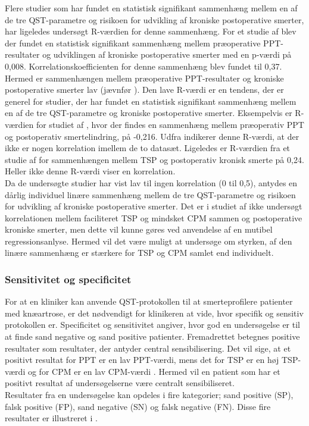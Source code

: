 Flere studier som har fundet en statistisk signifikant sammenhæng mellem en af de tre QST-parametre og risikoen for udvikling af kroniske postoperative smerter, har ligeledes undersøgt R-værdien for denne sammenhæng. For et studie af  blev der fundet en statistisk signifikant sammenhæng mellem præoperative PPT-resultater og udviklingen af kroniske postoperative smerter med en p-værdi på 0,008. Korrelationskoefficienten for denne sammenhæng blev fundet til 0,37. Hermed er sammenhængen mellem præoperative PPT-resultater og kroniske postoperative smerter lav (jævnfør ). Den lave R-værdi er en tendens, der er generel for studier, der har fundet en statistisk signifikant sammenhæng mellem en af de tre QST-parametre og kroniske postoperative smerter. Eksempelvis er R-værdien for studiet af , hvor der findes en sammenhæng mellem præoperativ PPT og postoperativ smertelindring, på -0,216. Udfra  indikerer denne R-værdi, at der ikke er nogen korrelation imellem de to datasæt. Ligeledes er R-værdien fra et studie af  for sammenhængen mellem TSP og postoperativ kronisk smerte på 0,24. Heller ikke denne R-værdi viser en korrelation. \\
Da de undersøgte studier har vist lav til ingen korrelation (0 til 0,5), antydes en dårlig individuel linære sammenhæng mellem de tre QST-parametre og risikoen for udvikling af kroniske postoperative smerter. Det er i studiet af  ikke undersøgt korrelationen mellem faciliteret TSP og mindsket CPM sammen og postoperative kroniske smerter, men dette vil kunne gøres ved anvendelse af en mutibel regressionsanlyse. \citep{Zar2010} Hermed vil det være muligt at undersøge om styrken, af den linære sammenhæng er stærkere for TSP og CPM samlet end individuelt.

\subsubsection{Sensitivitet og specificitet}
For at en kliniker kan anvende QST-protokollen til at smerteprofilere patienter med knæartrose, er det nødvendigt for klinikeren at vide, hvor specifik og sensitiv protokollen er. Specificitet og sensitivitet angiver, hvor god en undersøgelse er til at finde sand negative og sand positive patienter. Fremadrettet betegnes positive resultater som resultater, der antyder central sensibilisering. Det vil sige, at et positivt resultat for PPT er en lav PPT-værdi, mens det for TSP er en høj TSP-værdi og for CPM er en lav CPM-værdi \citep{Petersen2016}. Hermed vil en patient som har et positivt resultat af undersøgelserne være centralt sensibiliseret. \\
Resultater fra en undersøgelse kan opdeles i fire kategorier; sand positive (SP), falsk positive (FP), sand negative (SN) og falsk negative (FN). Disse fire resultater er illustreret i .

